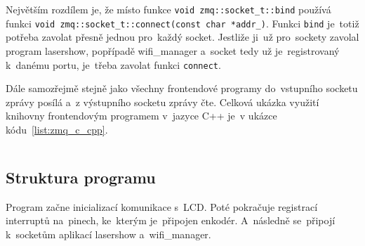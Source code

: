 Největším rozdílem je, že místo funkce \texttt{void zmq::socket_t::bind} používá funkci \texttt{void zmq::socket_t::connect(const char *addr_)}.
Funkci \texttt{bind} je~totiž potřeba zavolat přesně jednou pro~každý socket.
Jestliže ji~už pro~sockety zavolal program lasershow, popřípadě wifi\_manager a~socket tedy už je~registrovaný k~danému portu, je~třeba zavolat funkci \texttt{connect}.

Dále samozřejmě stejně jako všechny frontendové programy do~vstupního socketu zprávy posílá a~z výstupního socketu zprávy čte. Celková ukázka využití knihovny frontendovým programem v~jazyce C++ je~v ukázce kódu~\ref{list:zmq_c_cpp}.

\begin{code}
    \inputminted[frame=lines,fontsize=\footnotesize{}, linenos, breaklines]{cpp}{code_examples/zmq_client.cpp}
\end{code}

\subsection{Struktura programu}
Program začne inicializací komunikace s~LCD.
Poté pokračuje registrací interruptů na~pinech, ke~kterým je~připojen enkodér. A~následně se~připojí k~socketům aplikací lasershow a~wifi\_manager.

